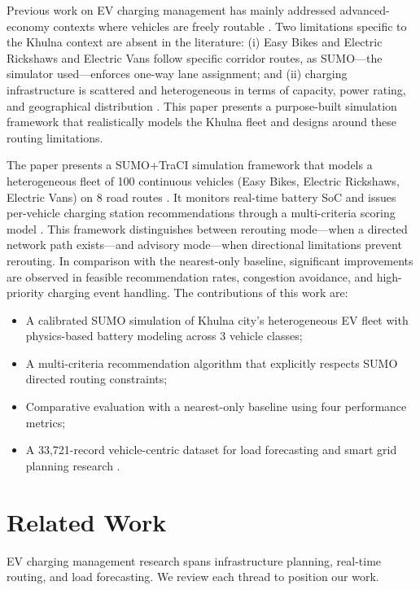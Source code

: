 \documentclass[conference]{IEEEtran}
\begin{document}
Previous work on EV charging management has mainly addressed advanced-economy contexts where vehicles are freely routable \cite{b5, b6}. Two limitations specific to the Khulna context are absent in the literature: (i) Easy Bikes and Electric Rickshaws and Electric Vans follow specific corridor routes, as SUMO---the simulator used---enforces one-way lane assignment; and (ii) charging infrastructure is scattered and heterogeneous in terms of capacity, power rating, and geographical distribution \cite{b15}. This paper presents a purpose-built simulation framework that realistically models the Khulna fleet and designs around these routing limitations.

The paper presents a SUMO+TraCI simulation framework that models a heterogeneous fleet of 100 continuous vehicles (Easy Bikes, Electric Rickshaws, Electric Vans) on 8 road routes \cite{b10, b11}. It monitors real-time battery SoC and issues per-vehicle charging station recommendations through a multi-criteria scoring model \cite{b7, b12}. This framework distinguishes between rerouting mode---when a directed network path exists---and advisory mode---when directional limitations prevent rerouting. In comparison with the nearest-only baseline, significant improvements are observed in feasible recommendation rates, congestion avoidance, and high-priority charging event handling. The contributions of this work are:
\begin{itemize}
\item A calibrated SUMO simulation of Khulna city's heterogeneous EV fleet with physics-based battery modeling across 3 vehicle classes;
\item A multi-criteria recommendation algorithm that explicitly respects SUMO directed routing constraints;
\item Comparative evaluation with a nearest-only baseline using four performance metrics;
\item A 33,721-record vehicle-centric dataset for load forecasting and smart grid planning research \cite{b8}.
\end{itemize}

\section{Related Work}

EV charging management research spans infrastructure planning, real-time routing, and load forecasting. We review each thread to position our work.
\end{document}
